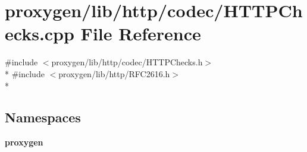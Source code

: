 \section{proxygen/lib/http/codec/\+H\+T\+T\+P\+Checks.cpp File Reference}
\label{HTTPChecks_8cpp}
{\ttfamily \#include $<$proxygen/lib/http/codec/\+H\+T\+T\+P\+Checks.\+h$>$}\\*
{\ttfamily \#include $<$proxygen/lib/http/\+R\+F\+C2616.\+h$>$}\\*
\subsection*{Namespaces}
\begin{DoxyCompactItemize}
\item 
 {\bf proxygen}
\end{DoxyCompactItemize}

